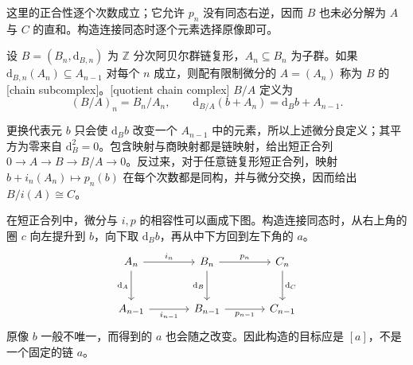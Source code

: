 这里的正合性逐个次数成立；它允许 \(p_n\) 没有同态右逆，因而 \(B\) 也未必分解为 \(A\) 与 \(C\) 的直和。构造连接同态时逐个元素选择原像即可。

\begin{definition}\label{g2:def:subcomplex-quotient}
	设 \(B=(B_n,\mathrm{d}_{B,n})\) 为 \(\mathbb Z\) 分次阿贝尔群链复形，\(A_n\subseteq B_n\) 为子群。如果 \(\mathrm{d}_{B,n}(A_n)\subseteq A_{n-1}\) 对每个 \(n\) 成立，则配有限制微分的 \(A=(A_n)\) 称为 \(B\) 的[chain subcomplex]。[quotient chain complex] \(B/A\) 定义为
	\[
		(B/A)_n=B_n/A_n,\qquad
		\mathrm{d}_{B/A}(b+A_n)=\mathrm{d}_Bb+A_{n-1}.
	\]
\end{definition}

更换代表元 \(b\) 只会使 \(\mathrm{d}_Bb\) 改变一个 \(A_{n-1}\) 中的元素，所以上述微分良定义；其平方为零来自 \(\mathrm{d}_B^2=0\)。包含映射与商映射都是链映射，给出短正合列 \(0\to A\to B\to B/A\to0\)。反过来，对于任意链复形短正合列，映射 \(b+i_n(A_n)\mapsto p_n(b)\) 在每个次数都是同构，并与微分交换，因而给出 \(B/i(A)\cong C\)。

在短正合列中，微分与 \(i,p\) 的相容性可以画成下图。构造连接同态时，从右上角的圈 \(c\) 向左提升到 \(b\)，向下取 \(\mathrm{d}_Bb\)，再从中下方回到左下角的 \(a\)。
\[
	\begin{tikzcd}[column sep=large,row sep=large]
		A_n \arrow[r,"i_n"] \arrow[d,"\mathrm{d}_A"']
		& B_n \arrow[r,"p_n"] \arrow[d,"\mathrm{d}_B"']
		& C_n \arrow[d,"\mathrm{d}_C"] \\
		A_{n-1} \arrow[r,"i_{n-1}"']
		& B_{n-1} \arrow[r,"p_{n-1}"']
		& C_{n-1}
	\end{tikzcd}
\]
原像 \(b\) 一般不唯一，而得到的 \(a\) 也会随之改变。因此构造的目标应是 \([a]\)，不是一个固定的链 \(a\)。

